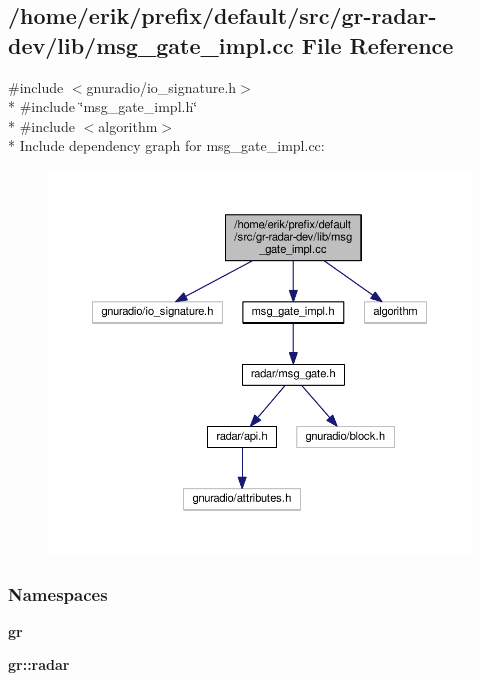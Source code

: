 \subsection{/home/erik/prefix/default/src/gr-\/radar-\/dev/lib/msg\+\_\+gate\+\_\+impl.cc File Reference}
\label{msg__gate__impl_8cc}
{\ttfamily \#include $<$gnuradio/io\+\_\+signature.\+h$>$}\\*
{\ttfamily \#include \char`\"{}msg\+\_\+gate\+\_\+impl.\+h\char`\"{}}\\*
{\ttfamily \#include $<$algorithm$>$}\\*
Include dependency graph for msg\+\_\+gate\+\_\+impl.\+cc\+:
\nopagebreak
\begin{figure}[H]
\begin{center}
\leavevmode
\includegraphics[width=350pt]{d7/dc8/msg__gate__impl_8cc__incl}
\end{center}
\end{figure}
\subsubsection*{Namespaces}
\begin{DoxyCompactItemize}
\item 
 {\bf gr}
\item 
 {\bf gr\+::radar}
\end{DoxyCompactItemize}
